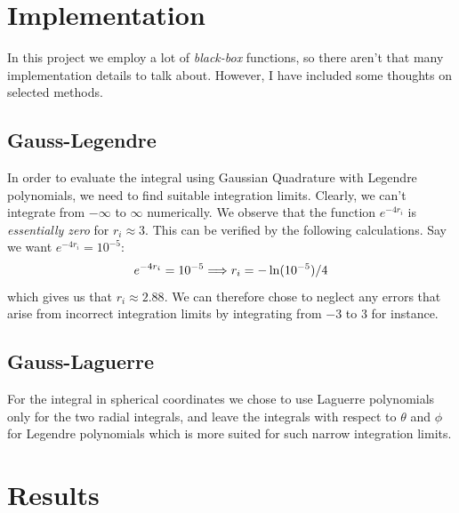 \documentclass[intlimits]{amsart}
\begin{document}
\section{Implementation}
\label{sec:implementation}

In this project we employ a lot of \emph{black-box} functions, so there aren't
that many implementation details to talk about. However, I have included some
thoughts on selected methods.

\subsection{Gauss-Legendre}
\label{sub:gauss_legendre}

In order to evaluate the integral using Gaussian Quadrature with Legendre
polynomials, we need to find suitable integration limits. Clearly, we can't
integrate from $-\infty$ to $\infty$ numerically. We observe that the function
$e^{-4r_i}$ is \emph{essentially zero} for $r_i \approx 3$. This can be
verified by the following calculations. Say we want $e^{-4r_i} = 10^{-5}$:
\begin{equation}
  \notag
  e^{-4r_i} = 10^{-5} \Longrightarrow r_i = -\ln(10^{-5}) / 4
\end{equation}
which gives us that $r_i \approx 2.88$. We can therefore chose to neglect any
errors that arise from incorrect integration limits by integrating from $-3$ to
$3$ for instance.

\subsection{Gauss-Laguerre}
\label{sub:gauss_laguerre}

For the integral in spherical coordinates we chose to use Laguerre polynomials
only for the two radial integrals, and leave the integrals with respect to
$\theta$ and $\phi$ for Legendre polynomials which is more suited for such
narrow integration limits.

\section{Results}
\label{sec:results}
\end{document}
